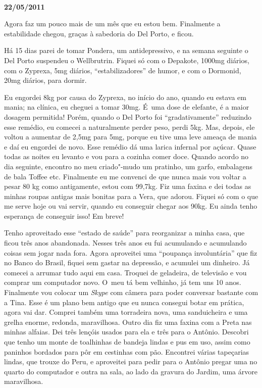 \begin{center}\asterisc{}​\end{center}


\begin{flushright}\textbf{22/05/2011}\end{flushright}


Agora faz um pouco mais de um mês que eu estou bem. Finalmente a
estabilidade chegou, graças à sabedoria do Del Porto, e ficou.

Há 15 dias parei de tomar Pondera, um antidepressivo, e na semana
seguinte o Del Porto suspendeu o Wellbrutrin. Fiquei só com o Depakote,
1000mg diários, com o Zyprexa, 5mg diários, ``estabilizadores'' de
humor, e com o Dormonid, 20mg diários, para dormir.

Eu engordei 8kg por causa do Zyprexa, no início do ano, quando eu estava
em mania; na clínica, eu cheguei a tomar 30mg. É~uma dose de elefante, é
a maior dosagem permitida! Porém, quando o Del Porto foi
``gradativamente'' reduzindo esse remédio, eu comecei a naturalmente
perder peso, perdi 5kg. Mas, depois, ele voltou a aumentar de 2,5mg para
5mg, porque eu tive uma leve ameaça de mania e daí eu engordei de novo.
Esse remédio dá uma larica infernal por açúcar. Quase todas as noites eu
levanto e vou para a cozinha comer doce. Quando acordo no dia seguinte,
encontro no meu criado"-mudo um pratinho, um garfo, embalagens de bala
Toffee etc. Finalmente eu me convenci de que nunca mais vou voltar a
pesar 80 kg como antigamente, estou com 99,7kg. Fiz uma faxina e dei
todas as minhas roupas antigas mais bonitas para a Vera, que adorou.
Fiquei só com o que me serve hoje ou vai servir, quando eu conseguir
chegar aos 90kg. Eu ainda tenho esperança de conseguir isso! Em breve!

Tenho aproveitado esse ``estado de saúde'' para reorganizar a minha
casa, que ficou três anos abandonada. Nesses três anos eu fui acumulando
e acumulando coisas sem jogar nada fora. Agora aproveitei uma ``poupança
involuntária'' que fiz no Banco do Brasil, fiquei sem gastar na
depressão, e acumulei um dinheiro. Já comecei a arrumar tudo aqui em
casa. Troquei de geladeira, de televisão e vou comprar um computador
novo. O~meu tá bem velhinho, já tem uns 10 anos. Finalmente vou colocar
um \emph{Skype} com câmera para poder conversar bastante com a Tina.
Esse é um plano bem antigo que eu nunca consegui botar em prática, agora
vai dar. Comprei também uma torradeira nova, uma sanduicheira e uma
grelha enorme, redonda, maravilhosa. Outro dia fiz uma faxina com a
Preta nas minhas alfaias. Dei três lençóis usados para ela e três para o
Antônio. Descobri que tenho um monte de toalhinhas de bandeja lindas e
pus em uso, assim como paninhos bordados para pôr em cestinhas com pão.
Encontrei várias tapeçarias lindas, que trouxe do Peru, e aproveitei
para pedir para o Antônio pregar uma no quarto do computador e outra na
sala, ao lado da gravura do Jardim, uma árvore maravilhosa.

